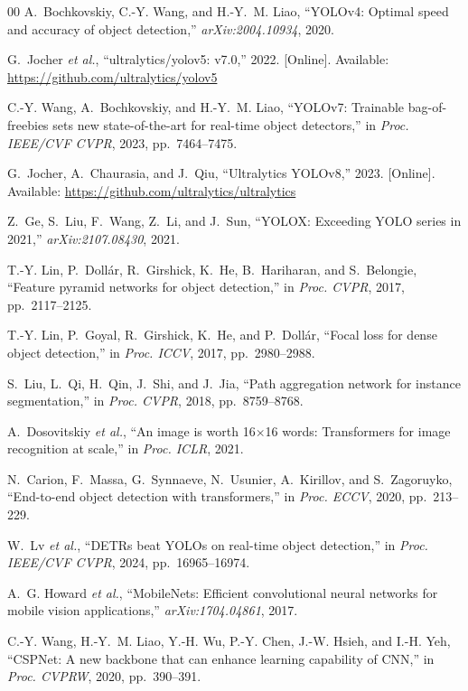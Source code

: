 \begin{thebibliography}{00}
A.~Bochkovskiy, C.-Y. Wang, and H.-Y.~M. Liao, ``YOLOv4: Optimal speed and
accuracy of object detection,'' \textit{arXiv:2004.10934}, 2020.

G.~Jocher \textit{et al.}, ``ultralytics/yolov5: v7.0,'' 2022. [Online].
Available: \url{https://github.com/ultralytics/yolov5}

C.-Y. Wang, A.~Bochkovskiy, and H.-Y.~M. Liao, ``YOLOv7: Trainable
bag-of-freebies sets new state-of-the-art for real-time object detectors,''
in \textit{Proc. IEEE/CVF CVPR}, 2023, pp.~7464--7475.

G.~Jocher, A.~Chaurasia, and J.~Qiu, ``Ultralytics YOLOv8,'' 2023. [Online].
Available: \url{https://github.com/ultralytics/ultralytics}

Z.~Ge, S.~Liu, F.~Wang, Z.~Li, and J.~Sun, ``YOLOX: Exceeding YOLO series
in 2021,'' \textit{arXiv:2107.08430}, 2021.

T.-Y. Lin, P.~Doll{\'a}r, R.~Girshick, K.~He, B.~Hariharan, and S.~Belongie,
``Feature pyramid networks for object detection,''
in \textit{Proc. CVPR}, 2017, pp.~2117--2125.

T.-Y. Lin, P.~Goyal, R.~Girshick, K.~He, and P.~Doll{\'a}r, ``Focal loss for
dense object detection,'' in \textit{Proc. ICCV}, 2017, pp.~2980--2988.

S.~Liu, L.~Qi, H.~Qin, J.~Shi, and J.~Jia, ``Path aggregation network for
instance segmentation,'' in \textit{Proc. CVPR}, 2018, pp.~8759--8768.

A.~Dosovitskiy \textit{et al.}, ``An image is worth 16$\times$16 words:
Transformers for image recognition at scale,'' in \textit{Proc. ICLR}, 2021.

N.~Carion, F.~Massa, G.~Synnaeve, N.~Usunier, A.~Kirillov, and S.~Zagoruyko,
``End-to-end object detection with transformers,''
in \textit{Proc. ECCV}, 2020, pp.~213--229.

W.~Lv \textit{et al.}, ``DETRs beat YOLOs on real-time object detection,''
in \textit{Proc. IEEE/CVF CVPR}, 2024, pp.~16965--16974.

A.~G. Howard \textit{et al.}, ``MobileNets: Efficient convolutional neural
networks for mobile vision applications,''
\textit{arXiv:1704.04861}, 2017.

C.-Y. Wang, H.-Y.~M. Liao, Y.-H. Wu, P.-Y. Chen, J.-W. Hsieh, and I.-H. Yeh,
``CSPNet: A new backbone that can enhance learning capability of CNN,''
in \textit{Proc. CVPRW}, 2020, pp.~390--391.


\end{thebibliography}
